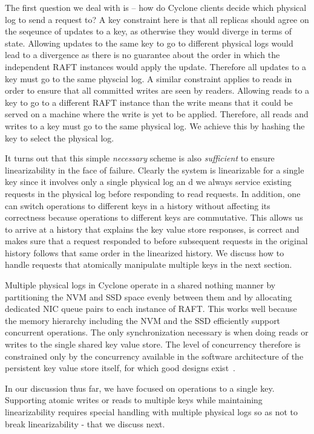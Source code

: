 \documentclass[pageno]{jpaper}
\begin{document}
The first question we deal with is -- how do Cyclone clients decide which
physical log to send a request to? A key constraint here is that all replicas
should agree on the seqeunce of updates to a key, as otherwise they would
diverge in terms of state. Allowing updates to the same key to go to different
physical logs would lead to a divergence as there is no guarantee about the
order in which the independent RAFT instances would apply the update. Therefore
all updates to a key must go to the same physcial log. A similar constraint
applies to reads in order to ensure that all committed writes are seen by
readers. Allowing reads to a key to go to a different RAFT instance than the
write means that it could be served on a machine where the write is yet to be
applied. Therefore, all reads and writes to a key must go to the same physical
log. We achieve this by hashing the key to select the physical log.

It turns out that this simple \emph{necessary} scheme is also \emph{sufficient}
to ensure linearizability in the face of failure. Clearly the system is
linearizable for a single key since it involves only a single physical log an d
we always service existing requests in the physical log before responding to
read requests. In addition, one can switch operations to different keys in a
history without affecting its correctness because operations to different keys
are commutative. This allows us to arrive at a history that explains the key
value store responses, is correct and makes sure that a request responded to
before subsequent requests in the original history follows that same order in
the linearized history. We discuss how to handle requests that atomically
manipulate multiple keys in the next section.

Multiple physical logs in Cyclone operate in a shared nothing manner by
partitioning the NVM and SSD space evenly between them and by allocating
dedicated NIC queue pairs to each instance of RAFT. This works well because the
memory hierarchy including the NVM and the SSD efficiently support concurrent
operations. The only synchronization necessary is when doing reads or writes to
the single shared key value store.  The level of concurrency therefore is
constrained only by the concurrency available in the software architecture of
the persistent key value store itself, for which good designs
exist~\cite{flodb}.

In our discussion thus far, we have focused on operations to a single
key. Supporting atomic writes or reads to multiple keys while maintaining
linearizability requires special handling with multiple physical logs so as not
to break linearizability - that we discuss next.
\end{document}
